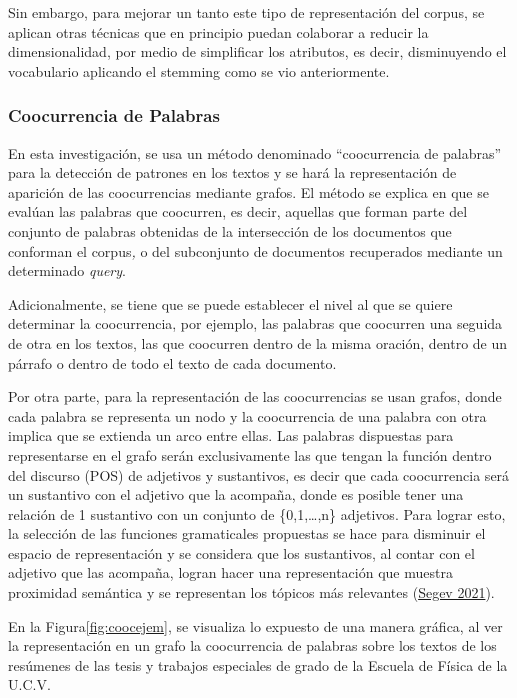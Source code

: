 \documentclass[
  12pt,
  openany]{book}
\begin{document}
Sin embargo, para mejorar un tanto este tipo de representación del corpus, se aplican otras técnicas que en principio puedan colaborar a reducir la dimensionalidad, por medio de simplificar los atributos, es decir, disminuyendo el vocabulario aplicando el stemming como se vio anteriormente.

\hypertarget{coocurrencia}{%
\subsubsection{Coocurrencia de Palabras}\label{coocurrencia}}

En esta investigación, se usa un método denominado ``coocurrencia de palabras'' para la detección de patrones en los textos y se hará la representación de aparición de las coocurrencias mediante grafos. El método se explica en que se evalúan las palabras que coocurren, es decir, aquellas que forman parte del conjunto de palabras obtenidas de la intersección de los documentos que conforman el corpus\emph{,} o del subconjunto de documentos recuperados mediante un determinado \emph{query}.

Adicionalmente, se tiene que se puede establecer el nivel al que se quiere determinar la coocurrencia, por ejemplo, las palabras que coocurren una seguida de otra en los textos, las que coocurren dentro de la misma oración, dentro de un párrafo o dentro de todo el texto de cada documento.

Por otra parte, para la representación de las coocurrencias se usan grafos, donde cada palabra se representa un nodo y la coocurrencia de una palabra con otra implica que se extienda un arco entre ellas. Las palabras dispuestas para representarse en el grafo serán exclusivamente las que tengan la función dentro del discurso (POS) de adjetivos y sustantivos, es decir que cada coocurrencia será un sustantivo con el adjetivo que la acompaña, donde es posible tener una relación de 1 sustantivo con un conjunto de \{0,1,\ldots,n\} adjetivos. Para lograr esto, la selección de las funciones gramaticales propuestas se hace para disminuir el espacio de representación y se considera que los sustantivos, al contar con el adjetivo que las acompaña, logran hacer una representación que muestra proximidad semántica y se representan los tópicos más relevantes (\protect\hyperlink{ref-segev2021}{Segev 2021}).

En la Figura\ref{fig:coocejem}, se visualiza lo expuesto de una manera gráfica, al ver la representación en un grafo la coocurrencia de palabras sobre los textos de los resúmenes de las tesis y trabajos especiales de grado de la Escuela de Física de la U.C.V.
\end{document}
